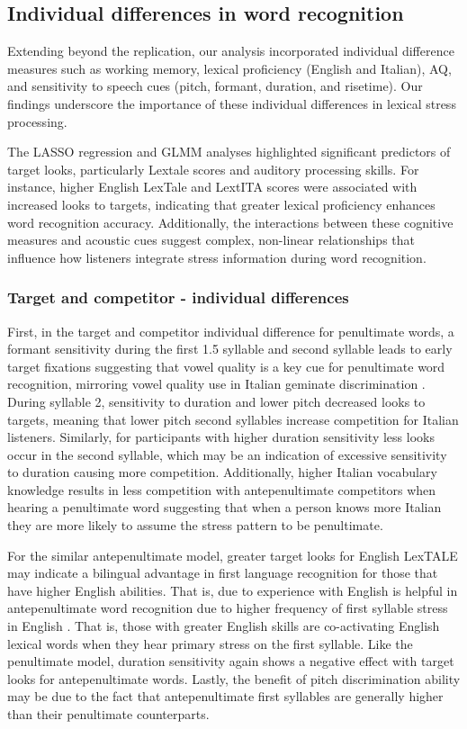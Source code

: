 \subsection{Individual differences in word recognition}
Extending beyond the replication, our analysis incorporated individual difference measures such as working memory, lexical proficiency (English and Italian), AQ, and sensitivity to speech cues (pitch, formant, duration, and risetime). Our findings underscore the importance of these individual differences in lexical stress processing.

The LASSO regression and GLMM analyses highlighted significant predictors of target looks, particularly Lextale scores and auditory processing skills. For instance, higher English LexTale and LextITA scores were associated with increased looks to targets, indicating that greater lexical proficiency enhances word recognition accuracy. Additionally, the interactions between these cognitive measures and acoustic cues suggest complex, non-linear relationships that influence how listeners integrate stress information during word recognition.


\subsubsection{Target and competitor - individual differences}
First, in the target and competitor individual difference for penultimate words, a formant sensitivity during the first 1.5 syllable and second syllable leads to early target fixations suggesting that vowel quality is a key cue for penultimate word recognition, mirroring vowel quality use in Italian geminate discrimination \cite{Tsukada_Cox_Hajek_Hirata_2017}. During syllable 2, sensitivity to duration and lower pitch decreased looks to targets, meaning that lower pitch second syllables increase competition for Italian listeners. Similarly, for participants with higher duration sensitivity less looks occur in the second syllable, which may be an indication of excessive sensitivity to duration causing more competition. Additionally, higher Italian vocabulary knowledge results in less competition with antepenultimate competitors when hearing a penultimate word suggesting that when a person knows more Italian they are more likely to assume the stress pattern to be penultimate.



For the similar antepenultimate model, greater target looks for English LexTALE may indicate a bilingual advantage in first language recognition for those that have higher English abilities. That is, due to experience with English is helpful in antepenultimate word recognition due to higher frequency of first syllable stress in English \cite{cutler2007dutch}.  That is, those with greater English skills are co-activating English lexical words when they hear primary stress on the first syllable. Like the penultimate model, duration sensitivity again shows a negative effect with target looks for antepenultimate words. Lastly, the benefit of pitch discrimination ability may be due to the fact that antepenultimate first syllables are generally higher than their penultimate counterparts. 

